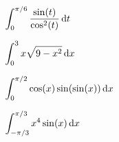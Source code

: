 \documentclass[10pt]{amsart}
\begin{document}
\vspace{2.5in}

\begin{multicols}{2}
  \begin{thm}
    \(\displaystyle{\int_0^{\pi/6} \frac{\sin(t)}{\cos^2(t)}\dif t}\)
  \end{thm}

  \begin{thm}
    \(\displaystyle{\int_0^3 x\sqrt{9 - x^2}\dif x}\)
  \end{thm}
\end{multicols}

\newpage

\begin{multicols}{2}
  \begin{thm}
    \(\displaystyle{\int_0^{\pi/2} \cos(x) \sin(\sin(x)) \dif x}\)
  \end{thm}

  \begin{thm}
    \(\displaystyle{\int_{-\pi/3}^{\pi/3} x^4\sin(x) \dif x}\)
  \end{thm}
\end{multicols}
\end{document}
